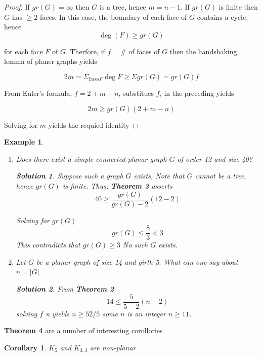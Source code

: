 \documentclass[12pt]{article}
\newtheorem*{corollary}{Corollary}
\newtheorem{example}{Example}
\newtheorem{solution}{Solution}
\begin{document}
\begin{proof}
	If $gr(G) = \infty$ then $G$ is a tree, hence $m = n-1$. If $gr(G)$ is finite then $G$ has $\ge 2$ faces. In this case, the boundary of each face of $G$ contains a cycle, hence
	\[\deg (F) \ge gr(G)\]

	for each face $F$ of $G$. Therfore, if $f = \#$ of faces of $G$ then the handshaking lemma of planer graphs yields

	\[ 2m = \Sigma_{\text{faces} F} \deg F \ge \Sigma gr(G) = gr(G) f\]

	From Euler's formula, $f = 2+m-n$, substitues $f_{i}$ in the preceding yields

	\[2m \ge gr(G) (2+m-n)\]

	Solving for $m$ yields the requied identity
\end{proof}


\begin{example}\

	\begin{enumerate}


		\item  Does there exist a simple connected planar graph $G$ of order 12 and size 40?
		      \begin{solution}

			      Suppose such a graph $G$ exists, Note that $G$ cannot be a tree, hence  $gr(G)$ is finite. Thus, \textbf{Theorem 3} asserts
			      \[40 \ge \frac{gr(G)}{gr(G) - 2} (12 - 2)\]

			      Solving for $gr(G)$
			      \[gr(G) \le \frac{8}{3} < 3\]
			      This contradicts that $gr(G) \ge 3$ No such $G$ exists.
		      \end{solution}

		\item Let $G$ be a planar graph of size 14 and girth 5. What can one  say about $n = \vert G\vert$

		      \begin{solution}
			      From \textbf{Theorem 2}
			      \[14 \le \frac{5}{5-2} (n-2)\]
			      solving $f$ n yields $n\ge 52/5$ some $n$ is an integer $n\ge 11$.
		      \end{solution}
	\end{enumerate}
\end{example}


\textbf{Theorem 4} are a number of interesting corollories

\begin{corollary}
	$K_{5}$ and $K_{3,3}$ are non-planar
\end{corollary}
\end{document}
